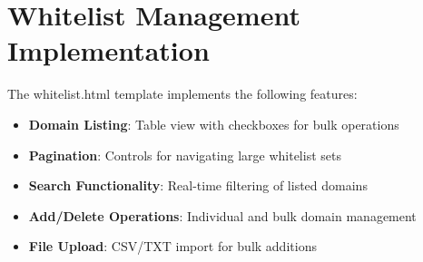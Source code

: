 \section{Whitelist Management Implementation}

The whitelist.html template implements the following features:

\begin{itemize}
    \item \textbf{Domain Listing}: Table view with checkboxes for bulk operations
    \item \textbf{Pagination}: Controls for navigating large whitelist sets
    \item \textbf{Search Functionality}: Real-time filtering of listed domains
    \item \textbf{Add/Delete Operations}: Individual and bulk domain management
    \item \textbf{File Upload}: CSV/TXT import for bulk additions
\end{itemize}

